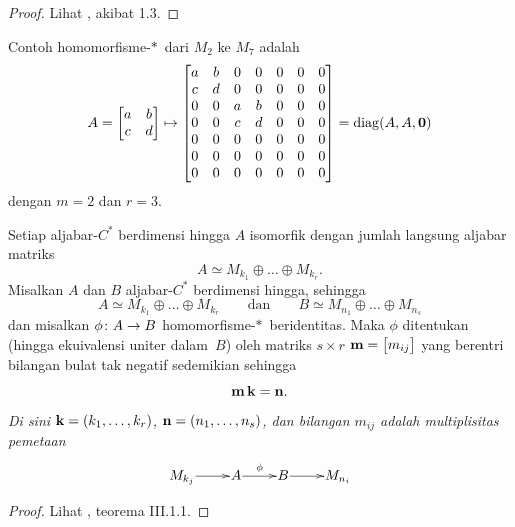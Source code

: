 \begin{proof} Lihat \cite{Power:1992}, akibat 1.3.  \ns \end{proof}

\begin{exam} Contoh homomorfisme-$*\,$ dari $M_2$ ke $M_7$ adalah
 \[  A =
  \begin{bmatrix} a & b \\ c & d  \end{bmatrix} \mapsto
    \begin{bmatrix}
      a & b & 0 & 0 & 0 & 0 & 0 \\
      c & d & 0 & 0 & 0 & 0 & 0 \\
      0 & 0 & a & b & 0 & 0 & 0 \\
      0 & 0 & c & d & 0 & 0 & 0 \\
      0 & 0 & 0 & 0 & 0 & 0 & 0 \\
      0 & 0 & 0 & 0 & 0 & 0 & 0 \\
      0 & 0 & 0 & 0 & 0 & 0 & 0
    \end{bmatrix} = \operatorname{diag}(A,A, \mathbf{0})\]
 dengan $m = 2$ dan $r = 3$.
\end{exam}

\enlargethispage{\baselineskip}

\begin{prop}\label{0068117} Setiap aljabar-$C^*$ berdimensi hingga $A$ isomorfik dengan
jumlah langsung aljabar matriks
   \[ A \simeq M_{k_1} \oplus \dots \oplus M_{k_r}.\]
Misalkan $A$ dan $B$ aljabar-$C^*$ berdimensi hingga, sehingga
   \[ A \simeq M_{k_1} \oplus \dots \oplus M_{k_r} \qquad \text{dan}
                          \qquad B \simeq M_{n_1} \oplus \dots \oplus M_{n_s} \]
dan misalkan $\phi\colon A \rightarrow B$ homomorfisme-$*\,$ beridentitas. Maka $\phi$
ditentukan (hingga ekuivalensi uniter dalam~$B$) oleh matriks $s \times r$ $\mathbf{m} = \bigl[
m_{ij}\bigr]$ yang berentri bilangan bulat tak negatif sedemikian sehingga %
   \begin{equation}\label{0068117i}
    \vc m\, \vc k = \vc n.
   \end{equation}
\emph{Di sini $\mathbf{k} = (k_1, \dots,k_r)$, $\mathbf{n} = (n_1, \dots, n_s)$, dan bilangan $m_{ij}$ adalah
multiplisitas pemetaan}
 \[\xymatrix@1{M_{k_j} \ar[r] & A \ar[r]^\phi & B \ar[r] & M_{n_i}
 }\]
\end{prop}

\begin{proof} Lihat \cite{Davidson:1996}, teorema III.1.1.  \ns \end{proof}

